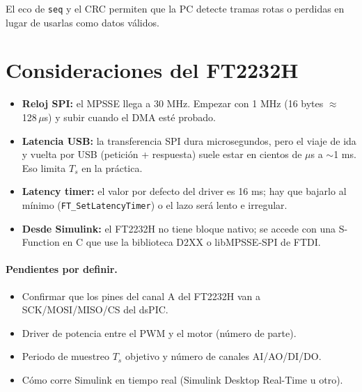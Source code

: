 \documentclass[11pt]{article}
\begin{document}
El eco de \texttt{seq} y el CRC permiten que la PC detecte tramas rotas o
perdidas en lugar de usarlas como datos válidos.

\section{Consideraciones del FT2232H}

\begin{itemize}
  \item \textbf{Reloj SPI:} el MPSSE llega a 30 MHz. Empezar con 1 MHz
        (16 bytes $\approx$ 128\,$\mu$s) y subir cuando el DMA esté probado.
  \item \textbf{Latencia USB:} la transferencia SPI dura microsegundos, pero
        el viaje de ida y vuelta por USB (petición + respuesta) suele estar en
        cientos de $\mu$s a $\sim$1 ms. Eso limita $T_s$ en la práctica.
  \item \textbf{Latency timer:} el valor por defecto del driver es 16 ms; hay
        que bajarlo al mínimo (\texttt{FT\_SetLatencyTimer}) o el lazo será
        lento e irregular.
  \item \textbf{Desde Simulink:} el FT2232H no tiene bloque nativo; se accede
        con una S-Function en C que use la biblioteca D2XX o libMPSSE-SPI de FTDI.
\end{itemize}

\paragraph{Pendientes por definir.}
\begin{itemize}
  \item Confirmar que los pines del canal A del FT2232H van a SCK/MOSI/MISO/CS del dsPIC.
  \item Driver de potencia entre el PWM y el motor (número de parte).
  \item Periodo de muestreo $T_s$ objetivo y número de canales AI/AO/DI/DO.
  \item Cómo corre Simulink en tiempo real (Simulink Desktop Real-Time u otro).
\end{itemize}
\end{document}
